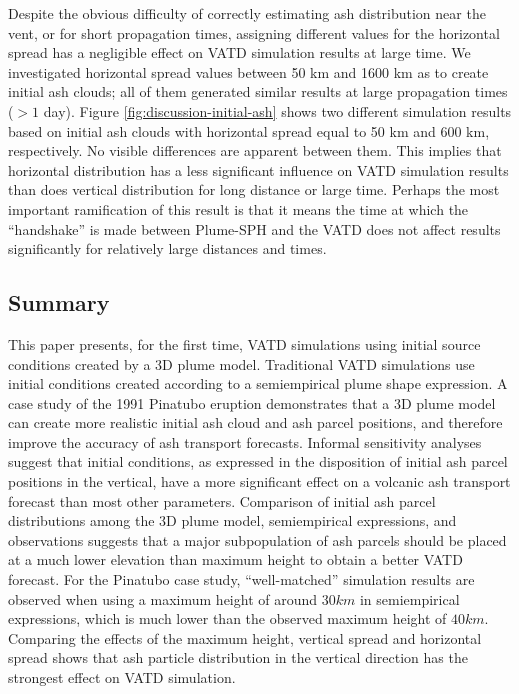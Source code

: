 \documentclass[utf8]{frontiersSCNS} %
\begin{document}
Despite the obvious difficulty of correctly estimating ash distribution near the vent, or for short propagation times, assigning different values for the horizontal spread has a negligible effect on VATD simulation results at large time. We investigated horizontal spread values between 50 km and 1600 km as to create initial ash clouds; all of them generated similar results at large propagation times ($> 1$ day). Figure \ref{fig:discussion-initial-ash} shows two different simulation results based on initial ash clouds with horizontal spread equal to 50 km and 600 km, respectively. No visible differences are apparent between them. This implies that horizontal distribution has a less significant influence on VATD simulation results than does vertical distribution for long distance or large time.  Perhaps the most important ramification of this result is that it means the time at which the ``handshake'' is made between Plume-SPH and the VATD does not affect results significantly for relatively large distances and times.

\subsection{Summary}

This paper presents, for the first time, VATD simulations using initial source conditions created by a 3D plume model. Traditional VATD simulations use initial conditions created according to a semiempirical plume shape expression. A case study of the 1991 Pinatubo eruption demonstrates that a 3D plume model can create more realistic initial ash cloud and ash parcel positions, and therefore improve the accuracy of ash transport forecasts. Informal sensitivity analyses suggest that initial conditions, as expressed in the disposition of initial ash parcel positions in the vertical, have a more significant effect on a volcanic ash transport forecast than most other parameters. Comparison of initial ash parcel distributions among the 3D plume model, semiempirical expressions, and observations suggests that a major subpopulation of ash parcels should be placed at a much lower elevation than maximum height to obtain a better VATD forecast. For the Pinatubo case study, ``well-matched'' simulation results are observed when using a maximum height of around $30 km$ in semiempirical expressions, which is much lower than the observed maximum height of $40 km$. Comparing the effects of the maximum height, vertical spread and horizontal spread shows that ash particle distribution in the vertical direction has the strongest effect on VATD simulation.
\end{document}
